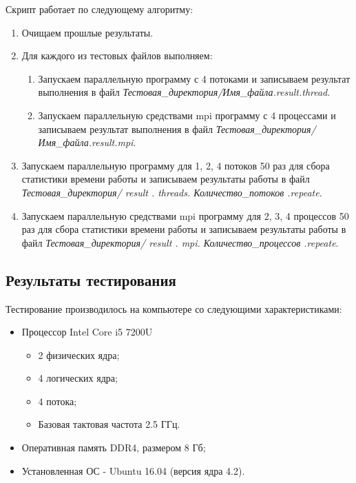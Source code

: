 \documentclass[12pt,a4paper]{report}
\begin{document}
				Скрипт работает по следующему алгоритму:
				\begin{enumerate}
					\item Очищаем прошлые результаты.
					\item Для каждого из тестовых файлов выполняем:
						\begin{enumerate}
							\item Запускаем параллельную программу с 4 потоками и записываем результат выполнения в файл \textit{Тестовая\_директория/Имя\_файла.result.thread}.
							\item Запускаем параллельную средствами mpi программу с 4 процессами и записываем результат выполнения в файл \textit{Тестовая\_директория/Имя\_файла.result.mpi}.
							
						\end{enumerate}
					\item Запускаем параллельную программу для 1, 2, 4 потоков 50 раз для сбора статистики времени работы и записываем результаты работы в файл \textit{Тестовая\_директория/ result . threads. Количество\_потоков .repeate}.
					\item Запускаем параллельную средствами mpi программу для 2, 3, 4 процессов 50 раз для сбора статистики времени работы и записываем результаты работы в файл \textit{Тестовая\_директория/ result . mpi. Количество\_процессов .repeate}.
				\end{enumerate}
			\subsection{Результаты тестирования}
				Тестирование производилось на компьютере со следующими характеристиками:
				
				\begin{itemize}
					\item Процессор Intel Core i5 7200U
						\begin{itemize}
							\item 2 физических ядра;
							\item 4 логических ядра;
							\item 4 потока;
							\item Базовая тактовая частота 2.5 ГГц.
						\end{itemize}
					\item Оперативная память DDR4, размером 8 Гб;
					\item Установленная ОС - Ubuntu 16.04 (версия ядра 4.2).
				\end{itemize}
				
\end{document}
